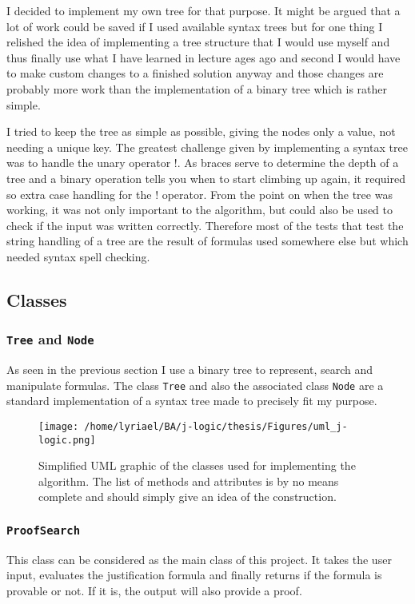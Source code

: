 I decided to implement my own tree for that purpose. It might be argued that a lot of work could be saved if I used available syntax trees but for one thing I relished the idea of implementing a tree structure that I would use myself and thus finally use what I have learned in lecture ages ago and second I would have to make custom changes to a finished solution anyway and those changes are probably more work than the implementation of a binary tree which is rather simple.

I tried to keep the tree as simple as possible, giving the nodes only a value, not needing a unique key. The greatest challenge given by implementing a syntax tree was to handle the unary operator $!$. As braces serve to determine the depth of a tree and a binary operation tells you when to start climbing up again, it required so extra case handling for the $!$ operator. From the point on when the tree was working, it was not only important to the algorithm, but could also be used to check if the input was written correctly. Therefore most of the tests that test the string handling of a tree are the result of formulas used somewhere else but which needed syntax spell checking. 

\subsection{Classes}

\subsubsection[Tree and Node]{\texttt{Tree} and \texttt{Node}}
As seen in the previous section I use a binary tree to represent, search and manipulate formulas. The class \texttt{Tree} and also the associated class \texttt{Node} are a standard implementation of a syntax tree made to precisely fit my purpose. 

\begin{figure}[H]
	\texttt{[image: /home/lyriael/BA/j-logic/thesis/Figures/uml\_j-logic.png]}
	\caption{Simplified UML graphic of the classes used for implementing the algorithm. The list of methods and attributes is by no means complete and should simply give an idea of the construction.}
	\label{uml}
\end{figure}


\subsubsection[ProofSearch]{\texttt{ProofSearch}}
This class can be considered as the main class of this project. It takes the user input, evaluates the justification formula and finally returns if the formula is provable or not. If it is, the output will also provide a proof.

